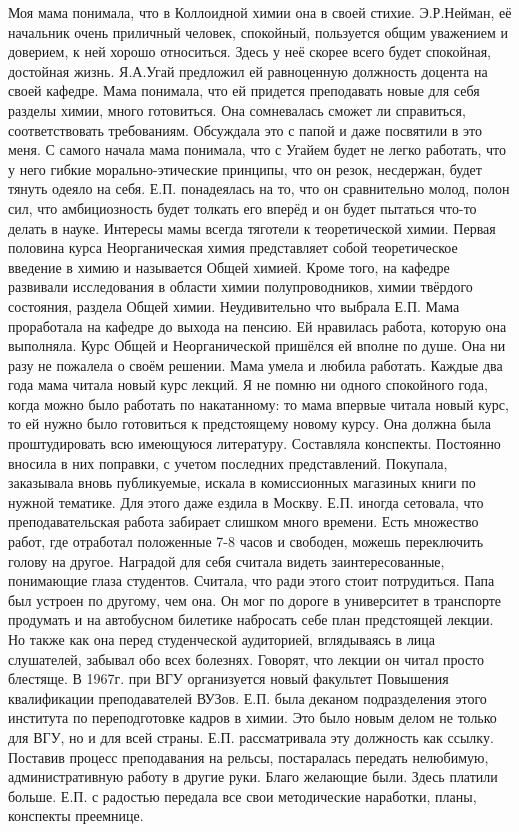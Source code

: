 Моя мама понимала, что в Коллоидной химии она в своей стихие. Э.Р.Нейман, её начальник очень приличный человек, спокойный, пользуется общим уважением и доверием, к ней хорошо относиться. Здесь у неё скорее всего будет спокойная, достойная жизнь.
Я.А.Угай предложил ей равноценную должность доцента на своей кафедре. Мама понимала, что ей придется преподавать новые для себя разделы химии, много готовиться. Она сомневалась сможет ли справиться, соответствовать требованиям. Обсуждала это с папой и даже посвятили в это меня. С самого начала мама понимала, что с Угайем будет не легко работать, что у него гибкие морально-этические принципы, что он резок, несдержан, будет тянуть одеяло на себя. Е.П. понадеялась на то, что он сравнительно молод, полон сил, что амбициозность будет толкать его вперёд и он будет пытаться что-то делать в науке. Интересы мамы всегда тяготели к теоретической химии. Первая половина курса Неорганическая химия представляет собой теоретическое введение в химию и называется Общей химией. Кроме того, на кафедре развивали исследования в области химии полупроводников, химии твёрдого состояния, раздела Общей химии. Неудивительно что выбрала Е.П. Мама проработала на кафедре до выхода на пенсию. Ей нравилась работа, которую она выполняла. Курс Общей и Неорганической пришёлся ей вполне по душе. Она ни разу не пожалела о своём решении.
Мама умела и любила работать. Каждые два года мама читала новый курс лекций. Я не помню ни одного спокойного года, когда можно было работать по накатанному: то мама впервые читала новый курс, то ей нужно было готовиться к предстоящему новому курсу. Она должна была проштудировать всю имеющуюся литературу. Составляла конспекты. Постоянно вносила в них поправки, с учетом последних представлений. Покупала, заказывала вновь публикуемые, искала в комиссионных магазиных книги по нужной тематике. Для этого даже ездила в Москву.
Е.П. иногда сетовала, что преподавательская работа забирает слишком много времени. Есть множество работ, где отработал положенные 7-8 часов и свободен, можешь переключить голову на другое. Наградой для себя считала видеть заинтересованные, понимающие глаза студентов. Считала, что ради этого стоит потрудиться. Папа был устроен по другому, чем она. Он мог по дороге в университет в транспорте продумать и на автобусном билетике набросать себе план предстоящей лекции. Но также как она перед студенческой аудиторией, вглядываясь в лица слушателей, забывал обо всех болезнях. Говорят, что лекции он читал просто блестяще.
В 1967г. при ВГУ организуется новый факультет Повышения квалификации преподавателей ВУЗов. Е.П. была деканом подразделения этого института по переподготовке кадров в химии. Это было новым делом не только для ВГУ, но и для всей страны. Е.П. рассматривала эту должность как ссылку. Поставив процесс преподавания на рельсы, постаралась передать нелюбимую, административную работу в другие руки. Благо желающие были. Здесь платили больше. Е.П. с радостью передала все свои методические наработки, планы, конспекты преемнице.
